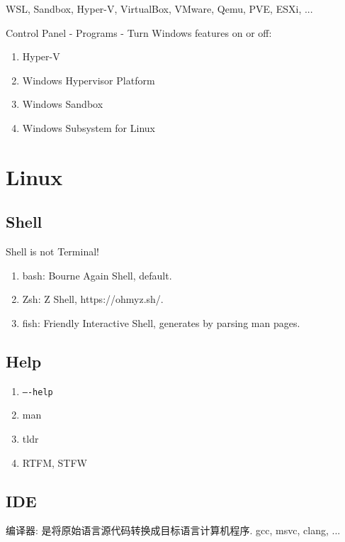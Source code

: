 \documentclass[a4paper]{article}
\begin{document}
WSL, Sandbox, Hyper-V, VirtualBox, VMware, Qemu, PVE, ESXi, ...

Control Panel - Programs - Turn Windows features on or off:

\begin{enumerate}[leftmargin=1cm, itemindent=1cm]
    \item Hyper-V
    \item Windows Hypervisor Platform
    \item Windows Sandbox
    \item Windows Subsystem for Linux
\end{enumerate}

\section{\LARGE Linux}

\subsection{\LARGE Shell}

Shell is not Terminal!

\begin{enumerate}[leftmargin=1cm, itemindent=1cm]
    \item bash: Bourne Again Shell, default.
    \item Zsh: Z Shell, https://ohmyz.sh/.
    \item fish: Friendly Interactive Shell, generates by parsing man pages.
\end{enumerate}

\subsection{\LARGE Help}

\begin{enumerate}[leftmargin=1cm, itemindent=1cm]
    \item {\tt ----help}
    \item man
    \item tldr
    \item RTFM, STFW
\end{enumerate}

\subsection{\LARGE IDE}

编译器: 是将原始语言源代码转换成目标语言计算机程序. gcc, msvc, clang, ...
\end{document}
